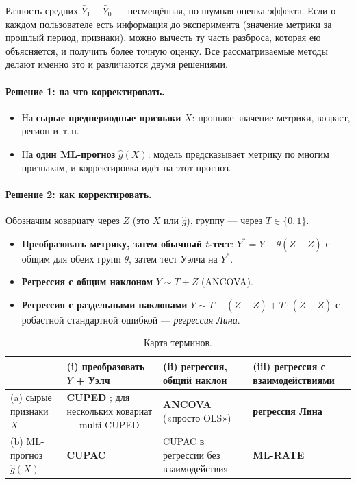 \documentclass[10pt,a4paper]{article}
\begin{document}
Разность средних $\bar Y_1-\bar Y_0$ --- несмещённая, но шумная оценка эффекта. Если о каждом
пользователе есть информация до эксперимента (значение метрики за прошлый период, признаки), можно
вычесть ту часть разброса, которая ею объясняется, и получить более точную оценку. Все
рассматриваемые методы делают именно это и различаются двумя решениями.

\paragraph{Решение 1: на что корректировать.}
\begin{itemize}
  \item[(a)] На \textbf{сырые предпериодные признаки} $X$: прошлое значение метрики, возраст, регион и~т.\,п.
  \item[(b)] На \textbf{один ML-прогноз} $\hat g(X)$: модель предсказывает метрику по многим признакам,
        и корректировка идёт на этот прогноз.
\end{itemize}

\paragraph{Решение 2: как корректировать.} Обозначим ковариату через $Z$ (это $X$ или $\hat g$),
группу --- через $T\in\{0,1\}$.
\begin{itemize}
  \item[(i)] \textbf{Преобразовать метрику, затем обычный $t$-тест}: $Y^*=Y-\theta(Z-\bar Z)$ с общим
        для обеих групп $\theta$, затем тест Уэлча на $Y^*$.
  \item[(ii)] \textbf{Регрессия с общим наклоном} $Y\sim T+Z$ (ANCOVA).
  \item[(iii)] \textbf{Регрессия с раздельными наклонами} $Y\sim T+(Z-\bar Z)+T\cdot(Z-\bar Z)$ с робастной
        стандартной ошибкой --- \emph{регрессия Лина}.
\end{itemize}

\begin{table}[tbp]
\centering\small
\caption{Карта терминов.}\label{tab:map}
\begin{tabularx}{\textwidth}{@{}l>{\raggedright\arraybackslash}X>{\raggedright\arraybackslash}X>{\raggedright\arraybackslash}X@{}}
\toprule
& (i) преобразовать $Y$ + Уэлч & (ii) регрессия, общий наклон & (iii) регрессия с взаимодействиями \\
\midrule
(a) сырые признаки $X$ & \textbf{CUPED} \citep{deng2013cuped}; для нескольких ковариат --- multi-CUPED & \textbf{ANCOVA} («просто OLS») & \textbf{регрессия Лина} \citep{lin2013} \\
(b) ML-прогноз $\hat g(X)$ & \textbf{CUPAC} \citep{poyarkov2016, doordash2020cupac} & CUPAC в регрессии без взаимодействия & \textbf{ML-RATE} \citep{guo2021mlrate} \\
\bottomrule
\end{tabularx}
\end{table}
\end{document}
